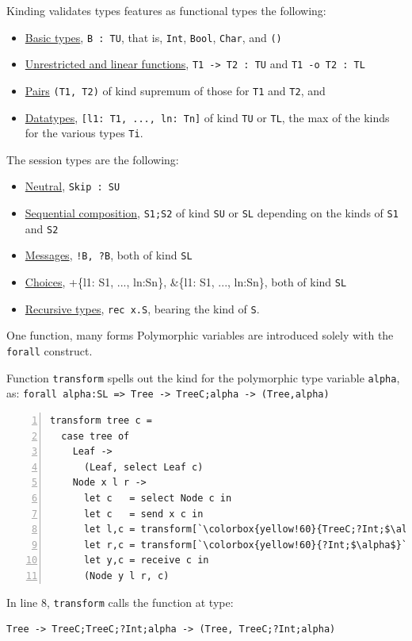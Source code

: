 \documentclass[10pt]{beamer}
\begin{document}
\begin{frame}{Kinding validates types}
\freest{} features as functional types the following:
\begin{itemize}
\item \underline{Basic types}, \lstinline|B : TU|, that is, \lstinline|Int|,
  \lstinline|Bool|, \lstinline|Char|, and \lstinline|()|
\item \underline{Unrestricted and linear functions}, \lstinline|T1 -> T2 : TU| and
  \lstinline|T1 -o T2 : TL|
\item \underline{Pairs} \lstinline|(T1, T2)| of kind
  supremum of those for
  \lstinline|T1| and \lstinline|T2|, and
\item \underline{Datatypes}, \lstinline|[l1: T1, ..., ln: Tn]| of kind
  \lstinline|TU| or \lstinline|TL|, the max of the kinds for the
  various types \lstinline|Ti|.
\end{itemize}
\pause

The session types are the following:
\begin{itemize}
\item \underline{Neutral}, \lstinline|Skip : SU|
\item \underline{Sequential composition}, \lstinline|S1;S2| of kind \lstinline|SU|
  or \lstinline|SL| depending on the kinds of \lstinline|S1| and
  \lstinline|S2|
\item  \underline{Messages}, \lstinline|!B, ?B|, both of kind \lstinline|SL|
\item \underline{Choices}, +\{l1: S1, ..., ln:Sn\}, \&\{l1: S1, ..., ln:Sn\},
  both of kind \lstinline|SL|
\item \underline{Recursive types}, \lstinline|rec x.S|, bearing the kind of
  \lstinline|S|.
\end{itemize}
	
\end{frame}

\begin{frame}[fragile]{One function, many forms}
	Polymorphic variables are introduced solely with the \lstinline|forall| construct.
	
	Function \lstinline|transform| spells out the kind for the
        polymorphic type variable \lstinline|alpha|, as:
        \lstinline|forall alpha:SL => Tree -> TreeC;alpha -> (Tree,alpha)|

\pause
\begin{lstlisting}[numbers=left, xleftmargin=0.7cm, escapeinside=\`\`]
transform tree c =
  case tree of
    Leaf ->
      (Leaf, select Leaf c)
    Node x l r ->
      let c   = select Node c in
      let c   = send x c in 
      let l,c = transform[`\colorbox{yellow!60}{TreeC;?Int;$\alpha$}`] l c in
      let r,c = transform[`\colorbox{yellow!60}{?Int;$\alpha$}`] r c in
      let y,c = receive c in
      (Node y l r, c)
\end{lstlisting}

\pause
In line 8, \lstinline|transform| calls the function at type:
\begin{lstlisting}
Tree -> TreeC;TreeC;?Int;alpha -> (Tree, TreeC;?Int;alpha)
\end{lstlisting}
	
\end{frame}
\end{document}
